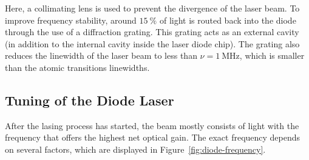 \noindent
Here, a collimating lens is used to prevent the divergence of the laser beam. To improve frequency stability,
around $\SI{15}{\percent}$ of light is routed back into the diode through the use of a diffraction grating.
This grating acts as an external cavity (in addition to the internal cavity inside the laser diode chip).
The grating also reduces the linewidth of the laser beam to less than $\nu = \SI{1}{\mega\hertz}$, which is
smaller than the atomic transitions linewidths.

\subsection{Tuning of the Diode Laser}
\label{sec:tuning}
After the lasing process has started, the beam mostly consists of light with the frequency that offers the highest
net optical gain. The exact frequency depends on several factors, which are displayed in
Figure~\ref{fig:diode-frequency}.
